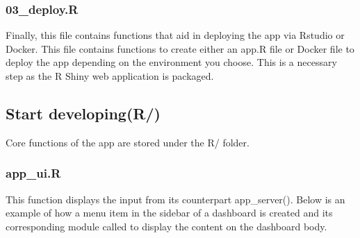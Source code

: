 \documentclass[]{article}
\newenvironment{Shaded}{\begin{snugshade}}{\end{snugshade}}
\newcommand{\CommentTok}[1]{\textcolor[rgb]{0.56,0.35,0.01}{\textit{#1}}}
\newcommand{\ControlFlowTok}[1]{\textcolor[rgb]{0.13,0.29,0.53}{\textbf{#1}}}
\newcommand{\DataTypeTok}[1]{\textcolor[rgb]{0.13,0.29,0.53}{#1}}
\newcommand{\DecValTok}[1]{\textcolor[rgb]{0.00,0.00,0.81}{#1}}
\newcommand{\KeywordTok}[1]{\textcolor[rgb]{0.13,0.29,0.53}{\textbf{#1}}}
\newcommand{\NormalTok}[1]{#1}
\newcommand{\OperatorTok}[1]{\textcolor[rgb]{0.81,0.36,0.00}{\textbf{#1}}}
\newcommand{\StringTok}[1]{\textcolor[rgb]{0.31,0.60,0.02}{#1}}
\begin{document}
\hypertarget{deploy.r}{%
\subsubsection{03\_deploy.R}\label{deploy.r}}

Finally, this file contains functions that aid in deploying the app via
Rstudio or Docker. This file contains functions to create either an
app.R file or Docker file to deploy the app depending on the environment
you choose. This is a necessary step as the R Shiny web application is
packaged.

\hypertarget{start-developingr}{%
\subsection{\texorpdfstring{\textbf{Start
developing}(R/)}{Start developing(R/)}}\label{start-developingr}}

Core functions of the app are stored under the R/ folder.

\hypertarget{app_ui.r}{%
\subsubsection{app\_ui.R}\label{app_ui.r}}

This function displays the input from its counterpart app\_server().
Below is an example of how a menu item in the sidebar of a dashboard is
created and its corresponding module called to display the content on
the dashboard body.

\begin{Shaded}
\end{Shaded}
\end{document}
